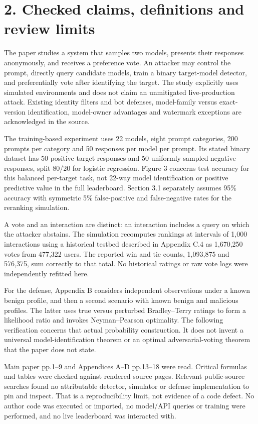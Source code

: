 \documentclass[10pt]{article}
\begin{document}
\section*{2. Checked claims, definitions and review limits}
The paper studies a system that samples two models, presents their responses anonymously, and receives a preference vote. An attacker may control the prompt, directly query candidate models, train a binary target-model detector, and preferentially vote after identifying the target. The study explicitly uses simulated environments and does not claim an unmitigated live-production attack. Existing identity filters and bot defenses, model-family versus exact-version identification, model-owner advantages and watermark exceptions are acknowledged in the source.\par
The training-based experiment uses 22 models, eight prompt categories, 200 prompts per category and 50 responses per model per prompt. Its stated binary dataset has 50 positive target responses and 50 uniformly sampled negative responses, split 80/20 for logistic regression. Figure 3 concerns test accuracy for this balanced per-target task, not 22-way model identification or positive predictive value in the full leaderboard. Section 3.1 separately assumes 95\% accuracy with symmetric 5\% false-positive and false-negative rates for the reranking simulation.\par
A vote and an interaction are distinct: an interaction includes a query on which the attacker abstains. The simulation recomputes rankings at intervals of 1,000 interactions using a historical testbed described in Appendix C.4 as 1,670,250 votes from 477,322 users. The reported win and tie counts, 1,093,875 and 576,375, sum correctly to that total. No historical ratings or raw vote logs were independently refitted here.\par
For the defense, Appendix B considers independent observations under a known benign profile, and then a second scenario with known benign and malicious profiles. The latter uses true versus perturbed Bradley–Terry ratings to form a likelihood ratio and invokes Neyman–Pearson optimality. The following verification concerns that actual probability construction. It does not invent a universal model-identification theorem or an optimal adversarial-voting theorem that the paper does not state.\par
Main paper pp.1–9 and Appendices A–D pp.13–18 were read. Critical formulas and tables were checked against rendered source pages. Relevant public-source searches found no attributable detector, simulator or defense implementation to pin and inspect. That is a reproducibility limit, not evidence of a code defect. No author code was executed or imported, no model/API queries or training were performed, and no live leaderboard was interacted with.\par
\end{document}
